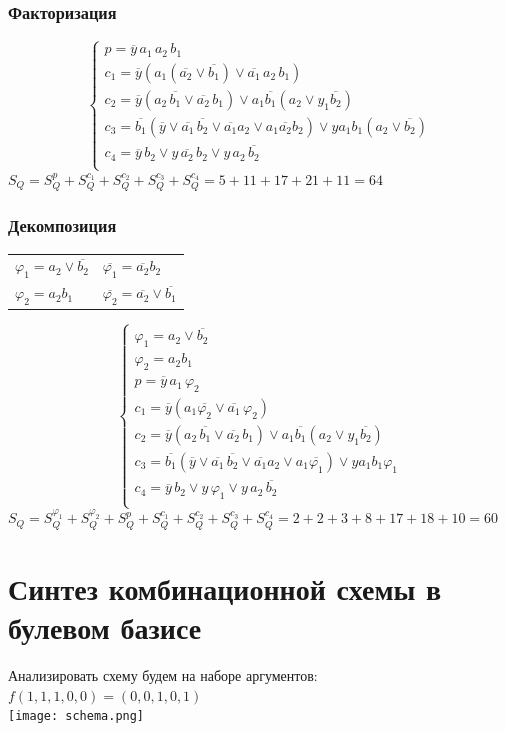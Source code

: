 \documentclass[12pt,a4paper]{report}
\begin{document}
\subsubsection*{Факторизация}
\begin{equation*}
    \begin{cases}
        p=\overline{y}\,a_1\,a_2\,b_1\\
        c_1=\overline{y}(a_1(\overline{a_2}\lor\overline{b_1})\lor\overline{a_1}\,a_2\,b_1)\\
        c_2=\overline{y}(a_2\,\overline{b_1}\lor \overline{a_2}\, b_1) \lor a_1\overline{b_1}(a_2\lor y_1\overline{b_2})\\
        c_3=\overline{b_1}(\overline{y}\lor \overline{a_1}\,\overline{b_2}\lor \overline{a_1}a_2 \lor a_1\overline{a_2}b_2)\lor ya_1b_1(a_2\lor\overline{b_2})\\
        c_4=\overline{y}\,b_2\lor y\,\overline{a_2}\,b_2 \lor y\,a_2\,\overline{b_2}\\
    \end{cases}
\end{equation*}
$S_Q=S_Q^p+S_Q^{c_1}+S_Q^{c_2}+S_Q^{c_3}+S_Q^{c_4}=5+11+17+21+11=64$
\subsubsection*{Декомпозиция}
\begin{tabular}{ll}
    $\varphi_1=a_2\lor \overline{b_2}$ & $\overline{\varphi_1}=\overline{a_2}b_2$\\
    $\varphi_2=a_2b_1$ & $\overline{\varphi_2}=\overline{a_2}\lor \overline{b_1}$
\end{tabular}
\begin{equation*}
    \begin{cases}
        \varphi_1=a_2\lor \overline{b_2}\\
        \varphi_2=a_2b_1\\
        p=\overline{y}\,a_1\,\varphi_2\\
        c_1=\overline{y}(a_1\overline{\varphi_2}\lor\overline{a_1}\,\varphi_2)\\
        c_2=\overline{y}(a_2\,\overline{b_1}\lor \overline{a_2}\, b_1) \lor a_1\overline{b_1}(a_2\lor y_1\overline{b_2})\\
        c_3=\overline{b_1}(\overline{y}\lor \overline{a_1}\,\overline{b_2}\lor \overline{a_1}a_2 \lor a_1\overline{\varphi_1})\lor ya_1b_1\varphi_1\\
        c_4=\overline{y}\,b_2\lor y\,\varphi_1 \lor y\,a_2\,\overline{b_2}\\
    \end{cases}
\end{equation*}
$S_Q=S_Q^{\varphi_1}+S_Q^{\varphi_2}+S_Q^p+S_Q^{c_1}+S_Q^{c_2}+S_Q^{c_3}+S_Q^{c_4}=2+2+3+8+17+18+10=60$
\newpage
\section*{Синтез комбинационной схемы в булевом базисе}
Анализировать схему будем на наборе аргументов: $f(1, 1, 1, 0, 0)= (0, 0, 1, 0, 1)$\\
\texttt{[image: schema.png]}
\end{document}

